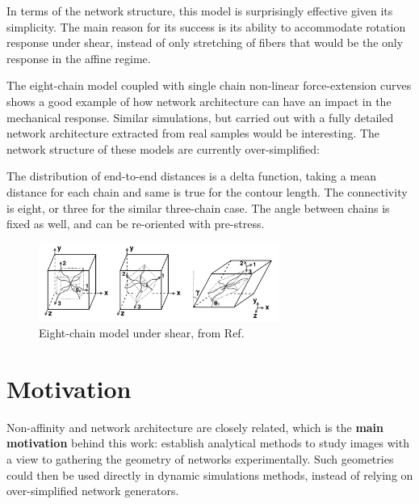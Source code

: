 In terms of the network structure, this model is surprisingly effective given its simplicity. The main reason for its success is its ability to accommodate rotation response under shear, instead of only stretching of fibers that would be the only response in the affine regime.

The eight-chain model coupled with single chain non-linear force-extension curves shows a good example of how network architecture can have an impact in the mechanical response. Similar simulations, but carried out with a fully detailed network architecture extracted from real samples would be interesting. The network structure of these models are currently over-simplified:

The distribution of end-to-end distances is a delta function, taking a mean distance for each chain and same is true for the contour length.
The connectivity is eight, or three for the similar three-chain case.
The angle between chains is fixed as well, and can be re-oriented with pre-stress.


\begin{figure}[ht]
  \centering
  \includegraphics[width=0.7\textwidth]{Figures/chapter-intro/eight_chain_shear_nolabels.png}
  \caption{Eight-chain model under shear, from Ref. \citep{palmer_constitutive_2008} }
  \label{fig:eight_chain_shear}
\end{figure}



\section{Motivation}%
\label{sec:motivation-intro}
Non-affinity and network architecture are closely related, which
is the \textbf{main motivation} behind this work: establish analytical methods to study images with a view to gathering
the geometry of networks experimentally. Such geometries could then be used directly in dynamic simulations methods, instead of relying on over-simplified network generators.

